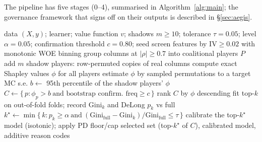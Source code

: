 \documentclass[9pt,journal]{IEEEtai}
\begin{document}
The pipeline has five stages (0--4), summarised in Algorithm~\ref{alg:main}; the governance
framework that signs off on their outputs is described in \S\ref{sec:aegis}.

\begin{algorithm}[!t]
\caption{Governed feature selection (one dataset, fixed configuration)}
\label{alg:main}
\small
\begin{algorithmic}[1]
\Require data $(X,y)$; learner; value function $v$; shadows $m\!\ge\!10$;
tolerance $\tau{=}0.05$; level $\alpha{=}0.05$; confirmation threshold $c{=}0.80$; seed
\State screen features by $\mathrm{IV}\!\ge\!0.02$ with monotonic WOE binning 
\State group columns at $|\rho|\!\ge\!0.7$ into coalitional players $P$ 
\State add $m$ shadow players: row-permuted copies of real columns
  \State compute exact Shapley values $\phi$ for all players
\Else
  \State estimate $\phi$ by sampled permutations to a target MC s.e.
\EndIf
\State $b \gets$ 95th percentile of the shadow players' $\phi$ 
\State $C \gets \{\,p : \phi_p > b \ \text{and bootstrap confirm.\ freq} \ge c\,\}$
\State rank $C$ by $\phi$ descending 
  \State fit top-$k$ on out-of-fold folds; record $\mathrm{Gini}_k$ and DeLong $p_k$ vs full
\EndFor
\State $k^\star \gets \min\{\,k : p_k\!\ge\!\alpha \ \text{and}\
  (\mathrm{Gini}_{\text{full}}\!-\!\mathrm{Gini}_k)/\mathrm{Gini}_{\text{full}}\!\le\!\tau\,\}$
\State calibrate the top-$k^\star$ model (isotonic); apply PD floor/cap \Comment{Stage 4}
\Ensure selected set (top-$k^\star$ of $C$), calibrated model, additive reason codes
\end{algorithmic}
\end{algorithm}
\end{document}
